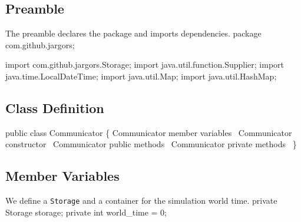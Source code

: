 \documentclass{article}
\def\nwendcode{\endtrivlist \endgroup}      %
\let\nwdocspar=\par
\begin{document}
\subsection{Preamble}
\label{sec:preamble}
The preamble declares the package and imports dependencies.
\nwenddocs{}\endmoddef{}
package com.github.jargors;
\nwendcode{}\nwdocspar
\nwenddocs{}\plusendmoddef
import com.github.jargors.Storage;
import java.util.function.Supplier;
import java.time.LocalDateTime;
import java.util.Map;
import java.util.HashMap;
\nwendcode{}\nwdocspar

\subsection{Class Definition}
\label{sec:class-definition}
\nwenddocs{}\endmoddef{}
public class Communicator \{
  \LA{}\code{}Communicator\edoc{} member variables~{\nwtagstyle{}}\RA{}
  \LA{}\code{}Communicator\edoc{} constructor~{\nwtagstyle{}}\RA{}
  \LA{}\code{}Communicator\edoc{} public methods~{\nwtagstyle{}}\RA{}
  \LA{}\code{}Communicator\edoc{} private methods~{\nwtagstyle{}}\RA{}
\}
\nwendcode{}\nwdocspar

\subsection{Member Variables}
\label{sec:member-variables}
We define a {\tt{}Storage} and a container for the simulation world time.
\nwenddocs{}\endmoddef{}
private Storage storage;
private int world_time = 0;
\eatline
{}\nwendcode{}\nwdocspar
\end{document}

